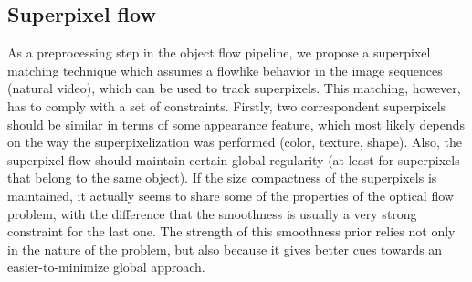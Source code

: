 \subsection{Superpixel flow}
\label{sec:suppix}


As a preprocessing step in the object flow pipeline, we propose a superpixel matching technique which assumes a flowlike behavior in the image 
sequences (natural video), which can be used to track superpixels. 
This matching, however, has to comply with a set of constraints. 
Firstly, two correspondent superpixels should be similar in terms of some appearance
feature, which most likely depends on the way the superpixelization was performed (color, texture,
shape). Also, the superpixel flow  should maintain certain global regularity (at least for
superpixels that belong to the same object). %
If the size compactness of the superpixels is maintained,  it actually seems to 
share some of the properties of the optical flow problem, with the difference that the
smoothness is usually a very strong constraint for the last one. 
The strength of this smoothness prior relies not only in the nature of the problem, but also
because it gives better cues towards an easier-to-minimize global approach.

